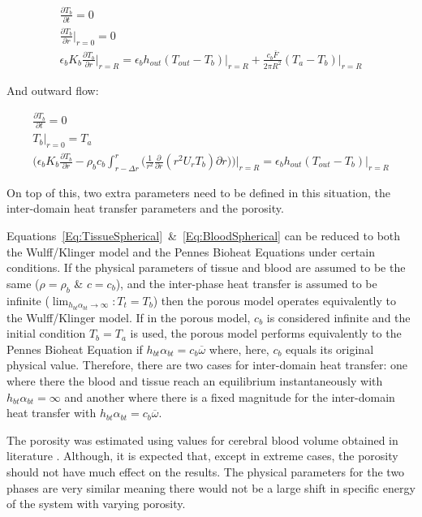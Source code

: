 \documentclass[11pt,english,a4paper,twoside,openright]{report}
\begin{document}
{{{{{{{{\begin{gather}
\frac{\partial T_{b}}{\partial t} = 0 \\
\frac{\partial T_{b}}{\partial r}\biggr|_{r=0} = 0 \\
\epsilon_{b}K_{b}\frac{\partial T_{b}}{\partial r}\biggr|_{r=R} = \epsilon_{b}h_{out}(T_{out}-T_{b})\bigr|_{r=R} + \frac{c_{b}\overline{F}}{2\pi R^{2}}(T_{a} - T_{b})\bigr|_{r=R}
\end{gather}

And outward flow:

\begin{gather}
\frac{\partial T_{b}}{\partial t} = 0 \\
T_{b}\bigr|_{r=0} = T_{a} \\
\bigg(\epsilon_{b}K_{b}\frac{\partial T_{b}}{\partial r} - \rho_{b}c_{b}\int_{r-\Delta r}^{r}\bigg(\frac{1}{r^{2}}\frac{\partial}{\partial r}(r^{2}U_{r}T_{b})\partial r\bigg)\bigg)\biggr|_{r=R} = \epsilon_{b}h_{out}(T_{out}-T_{b})\bigr|_{r=R}
\end{gather}

On top of this, two extra parameters need to be defined in this situation, the inter-domain heat transfer parameters and the porosity.

Equations~\ref{Eq:TissueSpherical}~\&~\ref{Eq:BloodSpherical} can be reduced to both the Wulff/Klinger model and the Pennes Bioheat Equations under certain conditions. If the physical parameters of tissue and blood are assumed to be the same ($\rho=\rho_{b}$ \& $c=c_{b}$), and the inter-phase heat transfer is assumed to be infinite ($\lim_{h_{bt}\alpha_{bt}\to\infty}: T_{t}=T_{b}$) then the porous model operates equivalently to the Wulff/Klinger model. If in the porous model, $c_{b}$ is considered infinite and the initial condition $T_{b} = T_{a}$ is used, the porous model performs equivalently to the Pennes Bioheat Equation if $h_{bt}\alpha_{bt} = c_{b}\overline{\omega}$ where, here, $c_{b}$ equals its original physical value. Therefore, there are two cases for inter-domain heat transfer: one where there the blood and tissue reach an equilibrium instantaneously with $h_{bt}\alpha_{bt}=\infty$ and another where there is a fixed magnitude for the inter-domain heat transfer with $h_{bt}\alpha_{bt} = c_{b}\overline{\omega}$.

The porosity was estimated using values for cerebral blood volume obtained in literature \cite{larsson2009measurement}. Although, it is expected that, except in extreme cases, the porosity should not have much effect on the results. The physical parameters for the two phases are very similar meaning there would not be a large shift in specific energy of the system with varying porosity. 

}}}}}}}}
\end{document}

